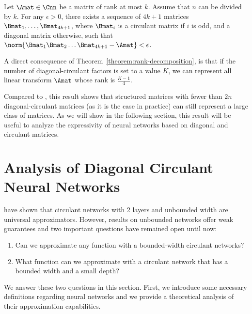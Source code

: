 \begin{theorem} \label{theorem:rank-decomposition}
Let $\Amat \in \Cnn$ be a matrix of rank at most $k$.
Assume that $n$ can be divided by $k$.
For any $\epsilon > 0$, there exists a sequence of $4k+1$ matrices $\Bmat_{1}, \ldots, \Bmat_{4k+1}$, where $\Bmat_{i}$ is a circulant matrix if $i$ is odd, and a diagonal matrix otherwise, such that $\norm{\Bmat_1 \Bmat_2 \ldots \Bmat_{4k+1} - \Amat} < \epsilon$.
\end{theorem}



A direct consequence of Theorem~\ref{theorem:rank-decomposition}, is that if the number of diagonal-circulant factors is set to a value $K$, we can represent all linear transform $\Amat$ whose rank is $\frac{K - 1}{4}$.

Compared to \citet{Huhtanen2015}, this result shows that structured matrices with fewer than $2n$ diagonal-circulant matrices (as it is the case in practice) can still represent a large class of matrices.
As we will show in the following section, this result will be useful to analyze the expressivity of neural networks based on diagonal and circulant matrices.


 \section{Analysis of Diagonal Circulant Neural Networks}
\label{section:analysis_diagonal_circulant}

\citet{pmlr-v70-zhao17b} have shown that circulant networks with 2 layers and unbounded width are universal approximators.
However, results on unbounded networks offer weak guarantees and two important questions have remained open until now: 
\begin{enumerate}
  \item Can we approximate any function with a bounded-width circulant networks?
  \item What function can we approximate with a circulant network that has a bounded width and a small depth?
\end{enumerate}

We answer these two questions in this section.
First, we introduce some necessary definitions regarding neural networks and we provide a theoretical analysis of their approximation capabilities.  


